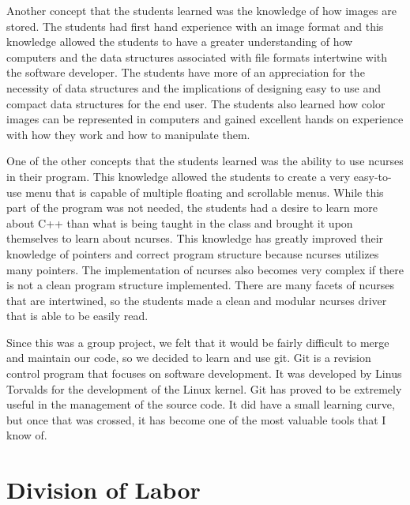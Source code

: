 \documentclass[pdftex, 11pt]{article}
\begin{document}
\begin{description}
	Another concept that the students learned was the knowledge of how images are stored. The students had first hand
experience with an image format and this knowledge allowed the students to have a greater understanding of how computers
and the data structures associated with file formats intertwine with the software developer. The students have more of
an appreciation for the necessity of data structures and the implications of designing easy to use and compact data
structures for the end user. The students also learned how color images can be represented in computers and gained
excellent hands on experience with how they work and how to manipulate them.

	One of the other concepts that the students learned was the ability to use ncurses in their program. This knowledge
allowed the students to create a very easy-to-use menu that is capable of multiple floating and scrollable menus. While
this part of the program was not needed, the students had a desire to learn more about C++ than what is being taught in
the class and brought it upon themselves to learn about ncurses. This knowledge has greatly improved their knowledge of
pointers and correct program structure because ncurses utilizes many pointers. The implementation of ncurses also becomes
very complex if there is not a clean program structure implemented. There are many facets of ncurses that are
intertwined, so the students made a clean and modular ncurses driver that is able to be easily read.

	Since this was a group project, we felt that it would be fairly difficult to merge and maintain our code, so we decided
to learn and use git. Git is a revision control program that focuses on software development. It was developed by Linus
Torvalds for the development of the Linux kernel. Git has proved to be extremely useful in the management of the source
code. It did have a small learning curve, but once that was crossed, it has become one of the most valuable tools that I
know of.

\section{Division of Labor}


\end{description}
\end{document}
